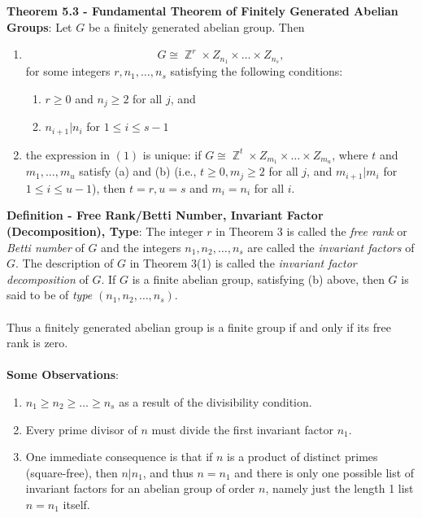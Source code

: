 \documentclass{article}
\DeclareMathOperator{\Z}{\mathbb{Z}}
\begin{document}
\textbf{Theorem 5.3 - Fundamental Theorem of Finitely Generated Abelian Groups}: Let $G$ be a finitely generated abelian group. Then \begin{enumerate}
    \item $$G \cong \Z^r \times Z_{n_1} \times \dots \times Z_{n_s},$$ for some integers $r, n_1, \dots, n_s$ satisfying the following conditions: \begin{enumerate}
        \item $r \geq 0$ and $n_j \geq 2$ for all $j$, and
        \item $n_{i + 1} | n_i$ for $1 \leq i \leq s - 1$
    \end{enumerate}
    \item the expression in $(1)$ is unique: if $G \cong \Z^t \times Z_{m_1} \times \dots \times Z_{m_u}$, where $t$ and $m_1, \dots, m_u$ satisfy (a) and (b) (i.e., $t \geq 0, m_j \geq 2$ for all $j$, and $m_{i + 1} | m_i$ for $1 \leq i \leq u - 1$), then $t = r, u = s$ and $m_i = n_i$ for all $i$.
\end{enumerate} $ $ \\
\textbf{Definition - Free Rank/Betti Number, Invariant Factor (Decomposition), Type}: The integer $r$ in Theorem 3 is called the \textit{free rank} or \textit{Betti number} of $G$ and the integers $n_1, n_2, \dots, n_s$ are called the \textit{invariant factors} of $G$. The description of $G$ in Theorem 3(1) is called the \textit{invariant factor decomposition} of $G$. If $G$ is a finite abelian group, satisfying (b) above, then $G$ is said to be of \textit{type} $(n_1, n_2, \dots, n_s)$. \\ \\
Thus a finitely generated abelian group is a finite group if and only if its free rank is zero. \\ \\
\textbf{Some Observations}: \begin{enumerate}
    \item $n_1 \geq n_2 \geq \dots \geq n_s$ as a result of the divisibility condition.
    \item Every prime divisor of $n$ must divide the first invariant factor $n_1$.
    \item One immediate consequence is that if $n$ is a product of distinct primes (square-free), then $n | n_1$, and thus $n = n_1$ and there is only one possible list of invariant factors for an abelian group of order $n$, namely just the length 1 list $n = n_1$ itself.
\end{enumerate} $ $ \\
\end{document}
